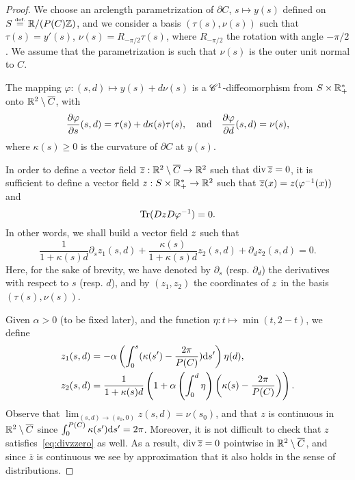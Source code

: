 \begin{proof}
 We choose an arclength parametrization of $\partial C$, $s\mapsto y(s)$ defined on $S\stackrel{\mbox{\upshape\tiny def.}}{=} \mathbb{R}/(P(C)\mathbb{Z})$, and we consider a basis $(\tau(s),\nu(s))$ such that $\tau(s)=y'(s)$, $\nu(s)=R_{-\pi/2}\tau(s)$, where $R_{-\pi/2}$ the rotation with angle $-\pi/2$. We assume that the parametrization is such that $\nu(s)$ is the outer unit normal to $C$.

The mapping $\varphi: (s,d)\mapsto y(s)+d\nu(s)$ is a $\mathscr{C}^{1}$-diffeomorphism from $S\times \mathbb{R}_+^*$ onto $\mathbb{R}^2\setminus \overline{C}$, with
\begin{equation*}
  \frac{\partial \varphi}{\partial s}(s,d)=\tau(s) + d\kappa(s)\tau(s),\quad \text{and} \quad  \frac{\partial \varphi}{\partial d}(s,d)= \nu(s),
\end{equation*}
where $\kappa(s)\geq 0$ is the curvature of $\partial C$ at $y(s)$.

In order to define a vector field $\overline{z}:\mathbb{R}^2\setminus\overline{C}\rightarrow \mathbb{R}^2$ such that $\operatorname{div} \overline{z}=0$, it is sufficient to define a vector field ${z}:S\times \mathbb{R}_+^*\rightarrow \mathbb{R}^2$ such that $\overline{z}(x)={z}(\varphi^{-1}(x))$ and
\begin{equation*}
  \operatorname{Tr}(D{z} D\varphi^{-1})=0.
\end{equation*}
In other words, we shall build a vector field ${z}$ such that
\begin{equation}\label{eq:divzzero}
  \frac{1}{1+\kappa(s)d}\partial_s z_1(s,d) +  \frac{\kappa(s)}{1+\kappa(s)d}z_2(s,d) +\partial_d z_2(s,d) =0.
\end{equation}
Here, for the sake of brevity, we have denoted by $\partial_s$ (resp. $\partial_d$) the derivatives with respect to $s$ (resp. $d$), and by $(z_1,z_2)$ the coordinates of ${z}$ in the basis  $(\tau(s),\nu(s))$.


Given $\alpha>0$ (to be fixed later), and the function $\eta: t\mapsto \min(t,2-t)$, we define
\begin{align}
  \label{eq:constrzoutu}  z_1(s,d)&= -\alpha \left(\int_0^s (\kappa(s')-\frac{2\pi}{P(C)})\mathrm{d} s'\right)\eta(d),\\
 \label{eq:constrzoutd}   z_2(s,d)&= \frac{1}{1+\kappa(s)d}\left(1+\alpha \left(\int_0^d \eta\right)\left(\kappa(s)- \frac{2\pi}{P(C)}\right)\right).
\end{align}
Observe that $\lim_{(s,d)\to (s_0,0)} z(s,d)=\nu(s_0)$, and that $z$ is continuous in $\mathbb{R}^2\setminus \overline{C}$ since $\int_0^{P(C)}\kappa(s')\mathrm{d} s'=2\pi$.
Moreover, it is not difficult to check that $z$ satisfies~\eqref{eq:divzzero} as well.
As a result, $\operatorname{div} \overline{z}=0$ pointwise in $\mathbb{R}^2\setminus \overline{C}$, and since $\overline{z}$ is continuous we see by approximation that it also holds in the sense of distributions.


\end{proof}
